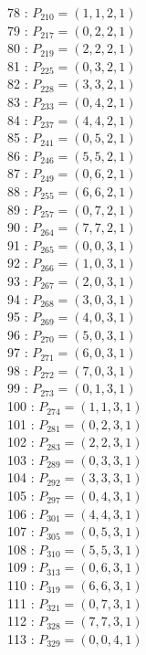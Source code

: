 \documentclass{article}
\begin{document}
{\begin{multicols}{3}
78 : $P_{210}=( 1, 1, 2, 1 )$\\
79 : $P_{217}=( 0, 2, 2, 1 )$\\
80 : $P_{219}=( 2, 2, 2, 1 )$\\
81 : $P_{225}=( 0, 3, 2, 1 )$\\
82 : $P_{228}=( 3, 3, 2, 1 )$\\
83 : $P_{233}=( 0, 4, 2, 1 )$\\
84 : $P_{237}=( 4, 4, 2, 1 )$\\
85 : $P_{241}=( 0, 5, 2, 1 )$\\
86 : $P_{246}=( 5, 5, 2, 1 )$\\
87 : $P_{249}=( 0, 6, 2, 1 )$\\
88 : $P_{255}=( 6, 6, 2, 1 )$\\
89 : $P_{257}=( 0, 7, 2, 1 )$\\
90 : $P_{264}=( 7, 7, 2, 1 )$\\
91 : $P_{265}=( 0, 0, 3, 1 )$\\
92 : $P_{266}=( 1, 0, 3, 1 )$\\
93 : $P_{267}=( 2, 0, 3, 1 )$\\
94 : $P_{268}=( 3, 0, 3, 1 )$\\
95 : $P_{269}=( 4, 0, 3, 1 )$\\
96 : $P_{270}=( 5, 0, 3, 1 )$\\
97 : $P_{271}=( 6, 0, 3, 1 )$\\
98 : $P_{272}=( 7, 0, 3, 1 )$\\
99 : $P_{273}=( 0, 1, 3, 1 )$\\
100 : $P_{274}=( 1, 1, 3, 1 )$\\
101 : $P_{281}=( 0, 2, 3, 1 )$\\
102 : $P_{283}=( 2, 2, 3, 1 )$\\
103 : $P_{289}=( 0, 3, 3, 1 )$\\
104 : $P_{292}=( 3, 3, 3, 1 )$\\
105 : $P_{297}=( 0, 4, 3, 1 )$\\
106 : $P_{301}=( 4, 4, 3, 1 )$\\
107 : $P_{305}=( 0, 5, 3, 1 )$\\
108 : $P_{310}=( 5, 5, 3, 1 )$\\
109 : $P_{313}=( 0, 6, 3, 1 )$\\
110 : $P_{319}=( 6, 6, 3, 1 )$\\
111 : $P_{321}=( 0, 7, 3, 1 )$\\
112 : $P_{328}=( 7, 7, 3, 1 )$\\
113 : $P_{329}=( 0, 0, 4, 1 )$\\

\end{multicols}}
\end{document}
